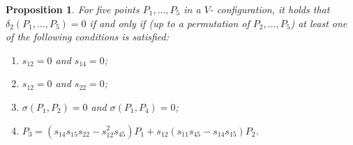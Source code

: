 \documentclass[a4paper, 11pt, reqno]{amsart}
\theoremstyle{plain}
\newtheorem{prop}[lemma]{Proposition}
\theoremstyle{definition}
\begin{document}
%
\begin{prop}
\label{proposition:definitionP3}
For five points $P_1, \dots, P_5$ in a $V$- configuration, it holds that
$\delta_2(P_1, \dotsc, P_5) = 0$ if and only if (up to a permutation of $P_2, \dots, P_5$) at least one of the following conditions
is satisfied:
%
\begin{enumerate}
  \item $s_{12} = 0$ and $s_{14} = 0$;
  \label{defP3_1}
  \item $s_{12} = 0$ and $s_{22} = 0$;
  \label{defP3_2}
  \item $\sigma(P_1, P_2) = 0$ and $\sigma(P_1, P_4) = 0$;
  \label{defP3_3}
  \item $P_3 = (s_{14}s_{15}s_{22}-s_{12}^2s_{45})P_1  +s_{12}(s_{11}s_{45}-s_{14}s_{15})P_2$.
  \label{defP3_4}
\end{enumerate}
%
\end{prop}
\end{document}
